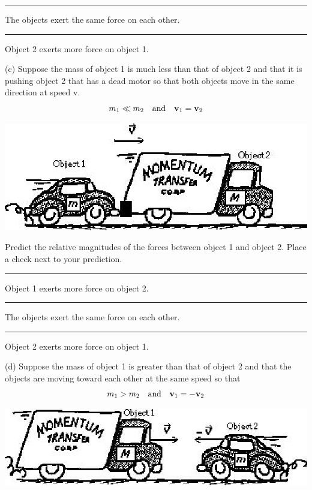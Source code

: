 \rule{0.5in}{0.1pt} The objects exert the same force on each other.

\rule{0.5in}{0.1pt} Object 2 exerts more force on object 1.

(c) Suppose the mass of object 1 is much less than that of object 2 and that
it is pushing object 2 that has a dead motor so that both objects move in the
same direction at speed v.
\[
m_{1}\ll m_{2}\quad \mbox{and}\quad {{\bf v}_{1}}={{\bf v}_{2}}\]


\vspace{0.3cm}
{\par\centering \includegraphics{newtons_laws/newtons_laws_fig3.eps} \par}
\vspace{0.3cm}

Predict the relative magnitudes of the forces between object 1 and object 2.
Place a check next to your prediction. 

\rule{0.5in}{0.1pt} Object 1 exerts more force on object 2. 

\rule{0.5in}{0.1pt} The objects exert the same force on each other. 

\rule{0.5in}{0.1pt} Object 2 exerts more force on object 1.

(d) Suppose the mass of object 1 is greater than that of object 2 and that the
objects are moving toward each other at the same speed so that
\[
m_{1}>m_{2}\quad \mbox{and}\quad {{\bf v}_{1}}=-{{\bf v}_{2}}\]


\vspace{0.3cm}
{\par\centering \includegraphics{newtons_laws/newtons_laws_fig4.eps} \par}
\vspace{0.3cm}

